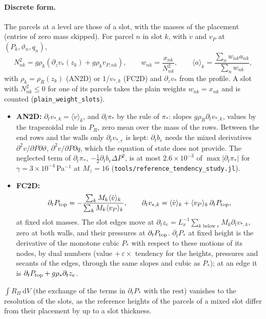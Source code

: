 \documentclass[11pt,a4paper]{article}
\newcommand{\vt}{\vartheta}
\newcommand{\code}[1]{\texttt{#1}}
\newcommand{\Ptop}{P_{\rm top}}
\begin{document}
\paragraph{Discrete form.} The parcels at a level are those of a slot, with the masses of the placement (entries of zero mass
skipped). For parcel $n$ in slot $k$, with $\dot v$ and $v_P$ at $(P_k,\vt_n,q_n)$,
\begin{equation}
  N^2_{nk}=g\rho_k\left(\partial_zv_*(z_k)+g\rho_kv_{P,nk}\right),\qquad w_{nk}=\frac{x_{nk}}{N^2_{nk}},\qquad
  \langle a\rangle_k=\frac{\sum_nw_{nk}a_{nk}}{\sum_nw_{nk}},
\end{equation}
with $\rho_k=\rho_R(z_k)$ (AN2D) or $1/v_{*,k}$ (FC2D) and $\partial_zv_*$ from the profile. A slot with $N^2_{nk}\le0$ for one
of its parcels takes the plain weights $w_{nk}=x_{nk}$ and is counted (\code{plain\_weight\_slots}).
\begin{itemize}
  \item \textbf{AN2D:} $\partial_tv_{*,k}=\langle\dot v\rangle_k$, and $\partial_t\pi_*$ by the rule of $\pi_*$: slopes
        $g\rho_R\partial_tv_{*,k}$, values by the trapezoidal rule in $P_R$, zero mean over the mass of the rows. Between the
        end rows and the walls only $\partial_tv_{*,e}$ is kept: $\partial_tb_e$ needs the mixed derivatives
        $\partial^2v/\partial P\partial\vt$, $\partial^2v/\partial P\partial q$, which the equation of state does not provide.
        The neglected term of $\partial_t\pi_*$, $-\tfrac12\partial_tb_e\Delta P^2$, is at most $2.6\times10^{-3}$ of
        $\max|\partial_t\pi_*|$ for $\gamma=3\times10^{-4}$\,Pa$^{-1}$ at $M_z=16$ (\code{tools/reference\_tendency\_study.jl}).
  \item \textbf{FC2D:}
        \begin{equation}
          \partial_t\Ptop=-\frac{\sum_kM_k\langle\dot v\rangle_k}{\sum_kM_k\langle v_P\rangle_k},\qquad
          \partial_tv_{*,k}=\langle\dot v\rangle_k+\langle v_P\rangle_k\,\partial_t\Ptop ,
        \end{equation}
        at fixed slot masses. The slot edges move at $\partial_tz_e=L_x^{-1}\sum_{k\text{ below }e}M_k\partial_tv_{*,k}$, zero at
        both walls, and their pressures at $\partial_t\Ptop$. $\partial_tP_*$ at fixed height is the derivative of the
        monotone cubic $P_*$ with respect to these motions of its nodes, by dual numbers (value $+\,\varepsilon\times$
        tendency for the heights, pressures and secants of the edges, through the same slopes and cubic as $P_*$); at an
        edge it is $\partial_t\Ptop+g\rho_*\partial_tz_e$.
\end{itemize}
$\int R_\Pi\,\mathrm{d}V$ (the exchange of the terms in $\partial_tP_*$ with the rest) vanishes to the resolution of the slots,
as the reference heights of the parcels of a mixed slot differ from their placement by up to a slot thickness.
\end{document}
